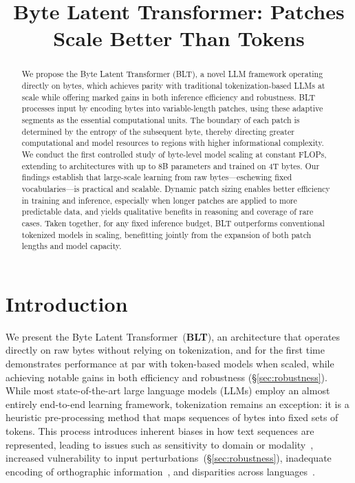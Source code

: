 \title{Byte Latent Transformer: Patches Scale Better Than Tokens}

\begin{abstract}
We propose the Byte Latent Transformer ({\textsc BLT}), a novel LLM framework operating directly on bytes, which achieves parity with traditional tokenization-based LLMs at scale while offering marked gains in both inference efficiency and robustness. {\textsc BLT} processes input by encoding bytes into variable-length patches, using these adaptive segments as the essential computational units. The boundary of each patch is determined by the entropy of the subsequent byte, thereby directing greater computational and model resources to regions with higher informational complexity. We conduct the first controlled study of byte-level model scaling at constant FLOPs, extending to architectures with up to 8B parameters and trained on 4T bytes. Our findings establish that large-scale learning from raw bytes—eschewing fixed vocabularies—is practical and scalable. Dynamic patch sizing enables better efficiency in training and inference, especially when longer patches are applied to more predictable data, and yields qualitative benefits in reasoning and coverage of rare cases. Taken together, for any fixed inference budget, {\textsc BLT} outperforms conventional tokenized models in scaling, benefitting jointly from the expansion of both patch lengths and model capacity.
\end{abstract}

\section{Introduction}
\label{section:intro}

We present the Byte Latent Transformer~(\textbf{BLT}), an architecture that operates directly on raw bytes without relying on tokenization, and for the first time demonstrates performance at par with token-based models when scaled, while achieving notable gains in both efficiency and robustness (\S\ref{sec:robustness}).
While most state-of-the-art large language models (LLMs) employ an almost entirely end-to-end learning framework, tokenization remains an exception: it is a heuristic pre-processing method that maps sequences of bytes into fixed sets of tokens. This process introduces inherent biases in how text sequences are represented, leading to issues such as sensitivity to domain or modality~\citep{dagangetting}, increased vulnerability to input perturbations~(\S\ref{sec:robustness}), inadequate encoding of orthographic information~\citep{edman2024cute}, and disparities across languages~\citep{liang2023xlm,petrov2024language,limisiewicz2024myte}.

